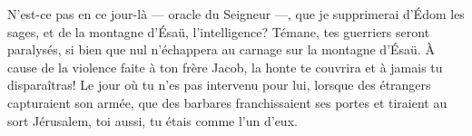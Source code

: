 N’est-ce pas en ce jour-là --- oracle du Seigneur ---,
	que je supprimerai d’Édom les sages, et de la montagne d’Ésaü, l’intelligence?
Témane, tes guerriers seront paralysés,
	si bien que nul n’échappera au carnage sur la montagne d’Ésaü.
À cause de la violence faite à ton frère Jacob,
	la honte te couvrira et à jamais tu disparaîtras!
Le jour où tu n’es pas intervenu pour lui,
	lorsque des étrangers capturaient son armée,
	que des barbares franchissaient ses portes et tiraient au sort Jérusalem,
	toi aussi, tu étais comme l’un d’eux.
